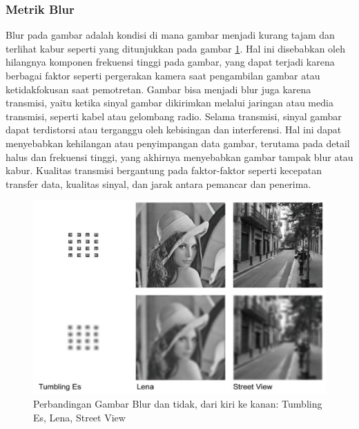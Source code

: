 \subsubsection{Metrik Blur}
\hspace{1,2cm}
Blur pada gambar adalah kondisi di mana gambar menjadi kurang tajam dan terlihat kabur seperti yang ditunjukkan pada gambar \ref{lena-blur}. Hal ini disebabkan oleh hilangnya komponen frekuensi tinggi pada gambar, yang dapat terjadi karena berbagai faktor seperti pergerakan kamera saat pengambilan gambar atau ketidakfokusan saat pemotretan. Gambar bisa menjadi blur juga karena transmisi, yaitu ketika sinyal gambar dikirimkan melalui jaringan atau media transmisi, seperti kabel atau gelombang radio. Selama transmisi, sinyal gambar dapat terdistorsi atau terganggu oleh kebisingan dan interferensi. Hal ini dapat menyebabkan kehilangan atau penyimpangan data gambar, terutama pada detail halus dan frekuensi tinggi, yang akhirnya menyebabkan gambar tampak blur atau kabur. Kualitas transmisi bergantung pada faktor-faktor seperti kecepatan transfer data, kualitas sinyal, dan jarak antara pemancar dan penerima. 

\begin{figure}[H]
	\vspace{-0.1cm}
	\begin{center}
		\includegraphics[width=0.8\columnwidth]{bab3/Gambar/lena-blur.png}
	\end{center}
	\vspace{-0.2cm}
	\caption{Perbandingan Gambar Blur dan tidak, dari kiri ke kanan: Tumbling Es, Lena, Street View \citep{Xu_2021}} \label{lena-blur}
\end{figure}

